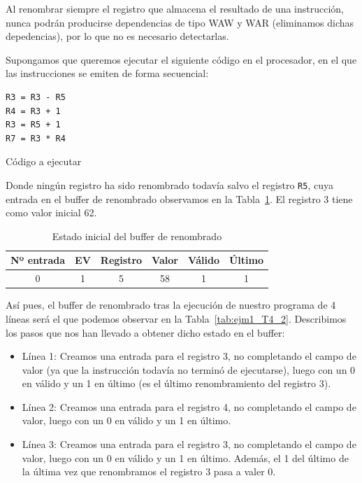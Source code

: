 Al renombrar siempre el registro que almacena el resultado de una instrucción, nunca podrán producirse dependencias de tipo WAW y WAR (eliminamos dichas depedencias), por lo que no es necesario detectarlas.

\begin{ejemplo}\label{ejm:T4_1}
    Supongamos que queremos ejecutar el siguiente código en el procesador, en el que las instrucciones se emiten de forma secuencial:
    \begin{listing}[H]
    \begin{verbatim}
R3 = R3 - R5
R4 = R3 + 1
R3 = R5 + 1
R7 = R3 * R4
    \end{verbatim}
    \caption{Código a ejecutar}
    \label{cod:ejm1_T4}
    \end{listing}
    Donde ningún registro ha sido renombrado todavía salvo el registro \verb|R5|, cuya entrada en el buffer de renombrado observamos en la Tabla~\ref{tab:ejm1_T4}. El registro 3 tiene como valor inicial 62.
    \begin{table}[H]
    \centering
    \begin{tabular}{|c|c|c|c|c|c|}
        \hline
        Nº entrada & EV & Registro & Valor & Válido & Último \\
        \hline
        0 & 1 & 5 & 58 & 1 & 1 \\
        \hline
    \end{tabular}
    \caption{Estado inicial del buffer de renombrado}
    \label{tab:ejm1_T4}
    \end{table}
    Así pues, el buffer de renombrado tras la ejecución de nuestro programa de 4 líneas será el que podemos observar en la Tabla~\ref{tab:ejm1_T4_2}. Describimos los pasos que nos han llevado a obtener dicho estado en el buffer:
    \begin{itemize}
        \item Línea 1: Creamos una entrada para el registro 3, no completando el campo de valor (ya que la instrucción todavía no terminó de ejecutarse), luego con un 0 en válido y un 1 en último (es el último renombramiento del registro 3).
        \item Línea 2: Creamos una entrada para el registro 4, no completando el campo de valor, luego con un 0 en válido y un 1 en último.
        \item Línea 3: Creamos una entrada para el registro 3, no completando el campo de valor, luego con un 0 en válido y un 1 en último. Además, el 1 del último de la última vez que renombramos el registro 3 pasa a valer 0.

\end{itemize}
\end{ejemplo}
